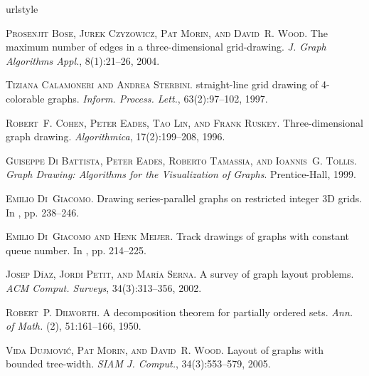 \documentclass[a4paper]{article}
\theoremstyle{plain}
\begin{document}
\begin{thebibliography}{24}
\providecommand{\natexlab}[1]{#1}
\expandafter\ifx\csname urlstyle\endcsname\relax
  \providecommand{\doi}[1]{doi:\discretionary{}{}{}#1}\else
  \providecommand{\doi}{doi:\discretionary{}{}{}\begingroup
  \urlstyle{rm}\Url}\fi

\textsc{Prosenjit Bose, Jurek Czyzowicz, Pat Morin, and David~R. Wood}.
\newblock The maximum number of edges in a three-dimensional grid-drawing.
\newblock \emph{J. Graph Algorithms Appl.}, 8(1):21--26, 2004.

\textsc{Tiziana Calamoneri and Andrea Sterbini}.
 straight-line grid drawing of 4-colorable graphs.
\newblock \emph{Inform. Process. Lett.}, 63(2):97--102, 1997.

\textsc{Robert~F. Cohen, Peter Eades, Tao Lin, and Frank Ruskey}.
\newblock Three-dimensional graph drawing.
\newblock \emph{Algorithmica}, 17(2):199--208, 1996.

\textsc{Guiseppe {Di Battista}, Peter Eades, Roberto Tamassia, and Ioannis~G.
  Tollis}.
\newblock \emph{Graph Drawing: Algorithms for the Visualization of Graphs}.
\newblock Prentice-Hall, 1999.

\textsc{Emilio Di~Giacomo}.
\newblock Drawing series-parallel graphs on restricted integer {3D} grids.
\newblock In  \cite{GD03}, pp. 238--246.

\textsc{Emilio Di~Giacomo and Henk Meijer}.
\newblock Track drawings of graphs with constant queue number.
\newblock In  \cite{GD03}, pp. 214--225.

\textsc{Josep D{\'i}az, Jordi Petit, and Mar{\'i}a Serna}.
\newblock A survey of graph layout problems.
\newblock \emph{ACM Comput. Surveys}, 34(3):313--356, 2002.

\textsc{Robert~P. Dilworth}.
\newblock A decomposition theorem for partially ordered sets.
\newblock \emph{Ann. of Math.} (2), 51:161--166, 1950.

\textsc{Vida Dujmovi{\'c}, Pat Morin, and David~R. Wood}.
\newblock Layout of graphs with bounded tree-width.
\newblock \emph{SIAM J. Comput.}, 34(3):553--579, 2005.


\end{thebibliography}
\end{document}
